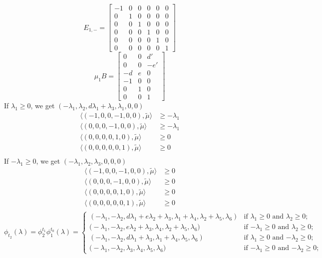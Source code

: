 \documentclass{amsart}
\numberwithin{theorem}{section}
\begin{document}
  \[E_{1,-}=\left[\begin{array}{cccccc} -1 & 0 & 0 & 0 & 0 & 0 \\ 0 & 1 & 0 & 0 & 0 & 0\\ 0 & 0 & 1 & 0 & 0 & 0\\ 0 & 0 & 0 & 1 & 0 & 0\\ 0 & 0 & 0 & 0 & 1 & 0\\ 0 & 0 & 0 & 0 & 0 &  1\end{array}\right]\]
  \[
    \mu_1 B=\left[\begin{array}{ccc} 
    0 & 0 & d' \\ 
    0 & 0 & -e'\\ 
    -d & e & 0\\ 
    -1 & 0 & 0\\ 
    0 & 1 & 0\\ 
    0 & 0 & 1
    \end{array}\right]
  \]
  If $\lambda_1 \ge 0$, we get $(-\lambda_1,\lambda_2,d\lambda_1+\lambda_3,\lambda_1,0,0)$
  \begin{align*}
    \langle (-1,0,0,-1,0,0), \tilde\mu\rangle &\ge -\lambda_1\\ 
    \langle (0,0,0,-1,0,0), \tilde\mu\rangle &\ge -\lambda_1\\ 
    \langle (0,0,0,0,1,0), \tilde\mu\rangle &\ge 0\\ 
    \langle (0,0,0,0,0,1), \tilde\mu\rangle &\ge 0\\ 
  \end{align*}
  If $-\lambda_1 \ge 0$, we get $(-\lambda_1,\lambda_2,\lambda_3,0,0,0)$
  \begin{align*}
    \langle (-1,0,0,-1,0,0), \tilde\mu\rangle &\ge 0\\ 
    \langle (0,0,0,-1,0,0), \tilde\mu\rangle &\ge 0\\ 
    \langle (0,0,0,0,1,0), \tilde\mu\rangle &\ge 0\\ 
    \langle (0,0,0,0,0,1), \tilde\mu\rangle &\ge 0\\ 
  \end{align*}
  \[
    \phi_{t_2}(\lambda)=\phi^{t_1}_2\phi^{t_0}_1(\lambda)
    =
    \begin{cases} 
      (-\lambda_1,-\lambda_2,d\lambda_1+e\lambda_2+\lambda_3,\lambda_1+\lambda_4,\lambda_2+\lambda_5,\lambda_6) & \text{if $\lambda_1 \ge 0$ and $\lambda_2 \ge 0$;}\\
      \big(-\lambda_1,-\lambda_2,e\lambda_2+\lambda_3,\lambda_4,\lambda_2+\lambda_5,\lambda_6\big) & \text{if $-\lambda_1 \ge 0$ and $\lambda_2 \ge 0$;}\\
      (-\lambda_1,-\lambda_2,d\lambda_1+\lambda_3,\lambda_1+\lambda_4,\lambda_5,\lambda_6) & \text{if $\lambda_1 \ge 0$ and $-\lambda_2 \ge 0$;}\\
      \big(-\lambda_1,-\lambda_2,\lambda_3,\lambda_4,\lambda_5,\lambda_6\big) & \text{if $-\lambda_1 \ge 0$ and $-\lambda_2 \ge 0$;}
    \end{cases}
  \]
\end{document}

